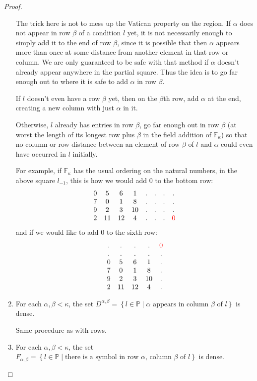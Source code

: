 \documentclass[12pt,a4paper]{article}
\newcommand{\F}{\mathbb{F}}
\newcommand{\st}{\; | \;}
\newcommand{\set}[2]{\left\{#1\st #2 \right\}}
\renewcommand{\P}{\mathbb{P}}
\begin{document}
\begin{proof}
\begin{enumerate}
	The trick here is not to mess up the Vatican property on the region. If $\alpha$ does not appear in row $\beta$ of a condition $l$ yet, it is not necessarily enough to simply add it to the end of row $\beta$, since it is possible that then $\alpha$ appears more than once at some distance from another element in that row or column. We are only guaranteed to be safe with that method if $\alpha$ doesn't already appear anywhere in the partial square. Thus the idea is to go far enough out to where it is safe to add $\alpha$ in row $\beta$.
	
	If $l$ doesn't even have a row $\beta$ yet, then on the $\beta$th row, add $\alpha$ at the end, creating a new column with just $\alpha$ in it.
	
	Otherwise, $l$ already has entries in row $\beta$, go far enough out in row $\beta$ (at worst the length of its longest row plus $\beta$ in the field addition of $\F_\kappa$) so that no column or row distance between an element of row $\beta$ of $l$ and $\alpha$ could even have occurred in $l$ initially.
	
	For example, if $\F_\kappa$ has the usual ordering on the natural numbers, in the above square $l_{-1}$, this is how we would add 0 to the bottom row:
$$\begin{array}{cccccccc}
	0 & 5 & 6 & 1 &.&.&.&.\\ 
	7 &  0 & 1 & 8 &.&.&.&. \\
	9 & 2 & 3 & 10&.&.&.&. \\
	2 & 11 & 12 & 4 & . & . & . & \color{red}0
\end{array}$$
and if we would like to add 0 to the sixth row:
$$\begin{array}{ccccccc}
	. & .& .& .& \color{red} 0\\
	. & . &. & . & .\\
	0 & 5 & 6 & 1 & .  \\ 
	7 &  0 & 1 & 8 & . \\
	9 & 2 & 3 & 10 & . \\
	2 & 11 & 12 & 4 & .
\end{array}$$

	
	\item For each $\alpha, \beta <\kappa$, the set $D^{\alpha,\beta}=\set{l \in \P}{\alpha \text{ appears in column } \beta \text{ of } l}$ is dense.
	
	Same procedure as with rows.	
	
	\item For each $\alpha, \beta < \kappa$, the set $F_{\alpha, \beta}=\set{l \in \P}{\text{there is a symbol in row $\alpha$, column $\beta$ of $l$}}$ is dense.
	

\end{enumerate}
\end{proof}
\end{document}
